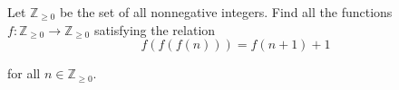Let 
$\mathbb{Z}_{\ge 0}$
 be the set of all nonnegative integers. Find all the functions 
$f: \mathbb{Z}_{\ge 0} \rightarrow \mathbb{Z}_{\ge 0} $
 satisfying the relation
\[ f(f(f(n))) = f(n+1 ) +1 \]


for all 
$ n\in \mathbb{Z}_{\ge 0}$.
